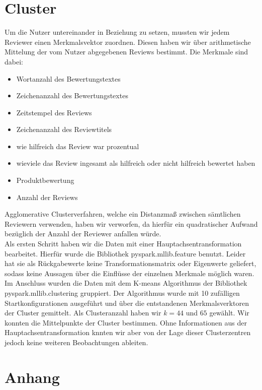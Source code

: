 \documentclass{scrartcl}
\theoremstyle{my_th_style}
\begin{document}
\section{Cluster}
Um die Nutzer untereinander in Beziehung zu setzen, mussten wir jedem Reviewer einen Merkmalsvektor zuordnen. Diesen haben wir über arithmetische Mittelung der vom Nutzer abgegebenen Reviews bestimmt. Die Merkmale sind dabei:
\begin{itemize}
\item Wortanzahl des Bewertungstextes
\item Zeichenanzahl des Bewertungstextes
\item Zeitstempel des Reviews
\item Zeichenanzahl des Reviewtitels
\item wie hilfreich das Review war prozentual
\item wieviele das Review ingesamt als hilfreich oder nicht hilfreich bewertet haben
\item Produktbewertung
\item Anzahl der Reviews
\end{itemize}

Agglomerative Clusterverfahren, welche ein Distanzmaß zwischen sämtlichen Reviewern verwenden, haben wir verworfen, da hierfür ein quadratischer Aufwand bezüglich der Anzahl der Reviewer anfallen würde.\\
Als ersten Schritt haben wir die Daten mit einer Hauptachsentransformation bearbeitet. Hierfür wurde die Bibliothek pyspark.mllib.feature benutzt. Leider hat sie als Rückgabewerte keine Transformationsmatrix oder Eigenwerte geliefert, sodass keine Aussagen über die Einflüsse der einzelnen Merkmale möglich waren. Im Anschluss wurden die Daten mit dem K-means Algorithmus der Bibliothek pyspark.mllib.clustering gruppiert. Der Algorithmus wurde mit 10 zufälligen Startkonfigurationen ausgeführt und über die entstandenen Merkmalsverktoren der Cluster gemittelt. Als Clusteranzahl haben wir $k=44$ und $65$ gewählt. Wir konnten die Mittelpunkte der Cluster bestimmen. Ohne Informationen aus der Hauptachsentransformation knnten wir aber von der Lage dieser Clusterzentren jedoch keine weiteren Beobachtungen ableiten.

\newpage
\section*{Anhang}
\end{document}
